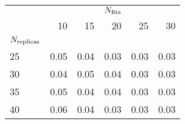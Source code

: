 \begin{center}
    \begin{tabular}{lrrrrr}
    \toprule
    {} & \multicolumn{5}{c}{$N_{\rm fits}$} \\
    {} &   10 &   15 &   20 &   25 &   30 \\
    $N_{\rm replicas}$ &      &      &      &      &      \\
    \midrule
    25            & 0.05 & 0.04 & 0.03 & 0.03 & 0.03 \\
    30            & 0.04 & 0.05 & 0.04 & 0.03 & 0.03 \\
    35            & 0.05 & 0.04 & 0.04 & 0.03 & 0.03 \\
    40            & 0.06 & 0.04 & 0.03 & 0.03 & 0.03 \\
    \bottomrule
    \end{tabular}
\end{center}